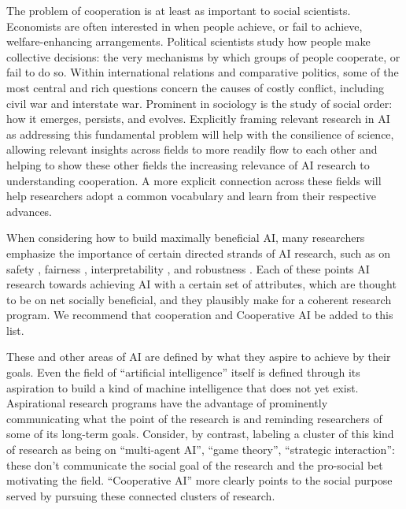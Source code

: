 \documentclass[11pt, a4paper, logo, onecolumn, nonumbering]{deepmind}
\begin{document}
The problem of cooperation is at least as important to social scientists. Economists are often
interested in when people achieve, or fail to achieve, welfare-enhancing arrangements. 
Political scientists study how people make collective decisions: the very mechanisms by which groups of people cooperate, or fail to do so. 
Within international relations and comparative politics, some of the most central and rich questions concern the causes of costly conflict, including civil war and interstate war. Prominent in sociology is the study of social order: how it emerges, persists, and evolves. 
Explicitly framing relevant research in AI as addressing this fundamental problem will help with the consilience of science, allowing relevant insights across fields to more readily flow to each other and helping to show these other fields the increasing relevance of AI research to understanding cooperation. A more explicit connection across these fields will help researchers adopt a common vocabulary and learn from their respective advances. 


When considering how to build maximally beneficial AI, 
many researchers emphasize the importance of 
certain directed strands of AI research, such as on safety \cite{amodei2016concrete, russell2019human}, fairness \cite{hardt2016equality}, %
interpretability \cite{olah2018building}, and robustness \cite{russell2015research, qin2019adversarial}.
Each of these points AI research towards achieving AI with a certain set of attributes, which are thought to be on net socially beneficial, and they plausibly make for a coherent research program. We recommend that cooperation and Cooperative AI be added to this list. 

These and other areas of AI are defined by what they aspire to achieve by their goals. 
Even the field of ``artificial intelligence'' itself is defined through its aspiration to build a kind of machine intelligence that does not yet exist. 
Aspirational research programs have the advantage of prominently communicating what the point of the research is and reminding researchers of some of its long-term goals.
Consider, by contrast, labeling a cluster of this kind of research
as being on ``multi-agent AI'', ``game theory'', ``strategic interaction'': these don't communicate the social goal of the research and the pro-social bet motivating the field. %
``Cooperative AI'' more clearly points to the social purpose served by pursuing these connected clusters of research. 
\end{document}
